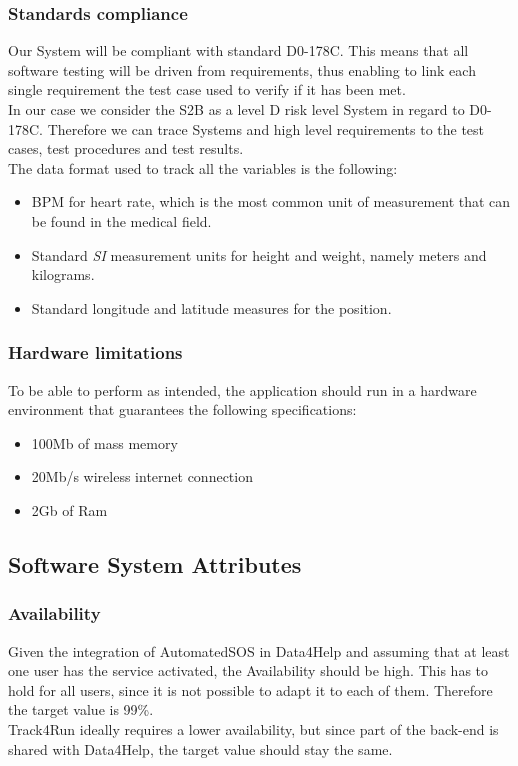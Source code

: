 \documentclass[titlepage]{article}
\begin{document}
			\subsubsection{Standards compliance}
			Our System will be compliant with standard D0-178C. This means that all software testing will be driven from 			requirements, thus enabling to link each single requirement the test case used to verify if it has been met.\\
			In our case we consider the S2B as a level D risk level System in regard to D0-178C. Therefore we can trace 			Systems and high level requirements to the test cases, test procedures and test results.\\
			The data format used to track all the variables is the following:
			\begin{itemize}
				\item BPM for heart rate, which is the most common unit of measurement that can be found in the 					medical field.
				\item Standard {\it SI} measurement units for height and  weight, namely meters and kilograms.
				\item Standard longitude and latitude measures for the position.
			\end{itemize}
		
			\subsubsection{Hardware limitations}
			To be able to perform as intended, the application should run in a hardware environment that guarantees the 			following specifications:
			\begin{itemize}
				\item 100Mb of mass memory 
				\item 20Mb/s wireless internet connection
				\item 2Gb of Ram 
			\end{itemize}
						
			
		\subsection{Software System Attributes}
			\subsubsection{Availability}
			Given the integration of AutomatedSOS in Data4Help and assuming that at least one user has the service 			activated, the Availability should be high. This has to hold for all users, since it is not possible to adapt it to 			each of them. Therefore the target value is 99\%. \\
			Track4Run ideally requires a lower availability, but since part of the back-end is shared with Data4Help, the 			target value should stay the same.\\
\end{document}

